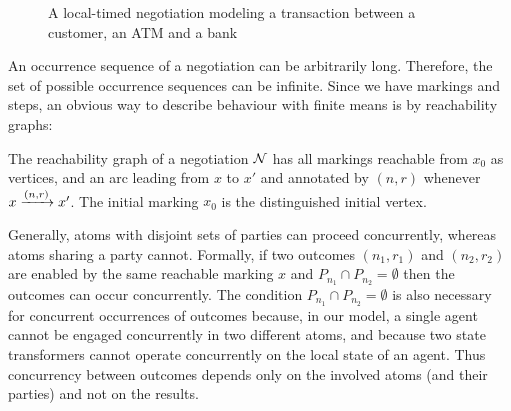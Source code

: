 \begin{figure}[t]
\caption{A local-timed negotiation modeling a transaction between a customer, an ATM and a bank}
\label{fig:ATM}
\end{figure}


An occurrence sequence of a negotiation can be arbitrarily long. Therefore, the set of possible occurrence sequences can be infinite. Since we have markings and steps, an obvious way to describe behaviour with finite means is by reachability graphs:

\begin{definition}
The reachability graph of a negotiation $\mathcal{N}$ has all markings reachable from $x_0$ as vertices, and an arc leading from $x$ to $x'$ and annotated by $(n, r)$ whenever $x \xrightarrow{(n, r)} x'$. The initial marking $x_0$ is the distinguished initial vertex.
\end{definition}

Generally, atoms with disjoint sets of parties can proceed concurrently, whereas atoms sharing a party cannot. Formally, if two outcomes $(n_1, r_1)$ and $(n_2, r_2)$ are enabled by the same reachable marking $x$ and $P_{n_1} \cap P_{n_2} = \emptyset$ then the outcomes can occur concurrently. The condition $P_{n_1} \cap P_{n_2} = \emptyset$ is also necessary for concurrent occurrences of outcomes because, in our model, a single agent cannot be engaged concurrently in two diﬀerent atoms, and because two state transformers cannot operate concurrently on the local state of an agent. Thus concurrency between outcomes depends only on the involved atoms (and their parties) and not on the results. 

